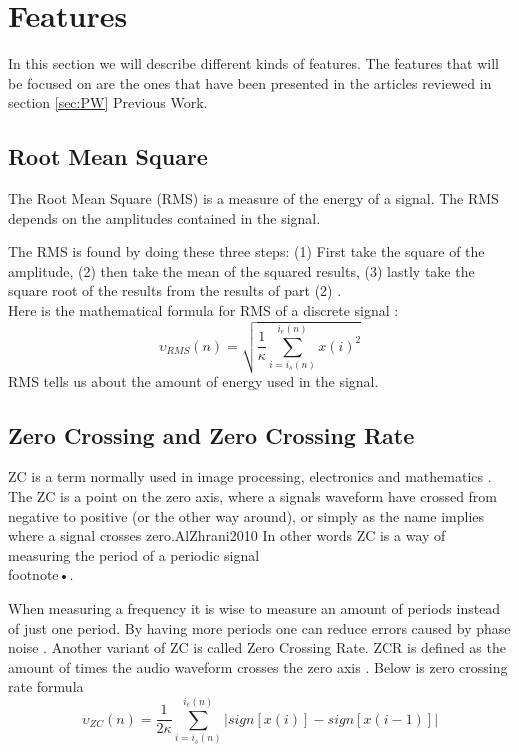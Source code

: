\section{Features}
In this section we will describe different kinds of features. The features that will be focused on are the ones that have been presented in the articles reviewed in section \ref{sec:PW} Previous Work.

\subsection{Root Mean Square}
The Root Mean Square (RMS) is a measure of the energy of a signal. The RMS depends on the amplitudes contained in the signal.


The RMS is found by doing these three steps:
(1) First take the square of the amplitude, (2) then take the mean of the squared results, (3) lastly take the square root of the results from the results of part (2) \citep{Bird2007}. \\ Here is the mathematical formula for RMS of a discrete signal \citep{ACA}:
\begin{equation}\label{eq:RMS formular}
\upsilon_{RMS}(n) = \sqrt{\frac{1}{\kappa}\sum_{i=i_s(n)}^{i_e(n)} x(i)^2}
\end{equation}
RMS tells us about the amount of energy used in the signal.

\subsection{Zero Crossing and Zero Crossing Rate}
ZC is a term normally used in image processing, electronics and mathematics \citep{AlZhrani2010}. The ZC is a point on the zero axis, where a signals waveform have crossed from negative to positive (or the other way around), or simply as the name implies where a signal crosses zero.{AlZhrani2010}
In other words ZC is a way of measuring the period of a periodic signal\\footnote{•}\citep{RWW2012}.


When measuring a frequency it is wise to measure an amount of periods instead of just one period. By having more periods one can reduce errors caused by phase noise \citep{RWW2012}.
Another variant of ZC is called Zero Crossing Rate. ZCR is defined as the amount of times the audio waveform crosses the zero axis \citep{DSShete}.
Below is zero crossing rate formula \citep{ACA} 
\begin{equation}\label{eq:ZCR}
\upsilon_{ZC}(n)= \frac{1}{2 \kappa}\sum_{i=i_s(n)}^{i_e (n)}|sign[x(i)]-sign[x(i-1)]|
\end{equation}

